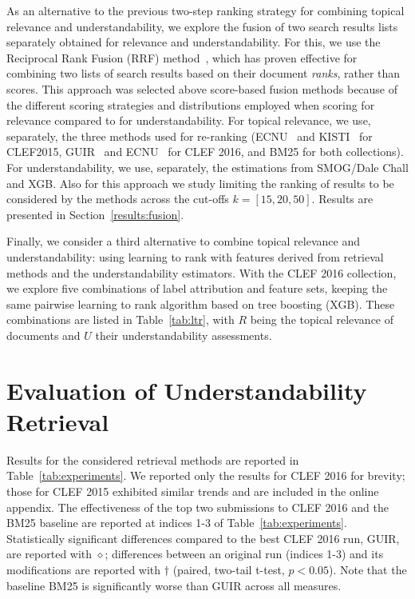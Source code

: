 As an alternative to the previous two-step ranking strategy for combining topical relevance and understandability, we explore the fusion of two search results lists separately obtained for relevance and understandability. For this, we use the Reciprocal Rank Fusion (RRF) method~\cite{cormack09}, which has proven effective for combining two lists of search results based on their document \textit{ranks}, rather than scores. This approach was selected above score-based fusion methods because of the different scoring strategies and distributions employed when scoring for relevance compared to for understandability. For topical relevance, we use, separately, the three methods used for re-ranking (ECNU~\cite{song15} and KISTI~\cite{oh15} for CLEF2015, GUIR~\cite{soldaini16} and ECNU~\cite{song16} for CLEF 2016, and BM25 for both collections). For understandability, we use, separately, the estimations from SMOG/Dale Chall and XGB. Also for this approach we study limiting the ranking of
results to be considered by the methods across the cut-offs $k=[15, 20, 50]$. Results are presented in Section~\ref{results:fusion}.

Finally, we consider a third alternative to combine topical relevance and understandability: using learning to rank with features derived from retrieval methods and the understandability estimators.
With the CLEF 2016 collection, we explore five combinations of label attribution and feature sets, keeping the same pairwise learning to rank algorithm based on tree boosting (XGB).
These combinations are listed in Table~\ref{tab:ltr}, with $R$ being the topical relevance of documents and $U$ their understandability assessments. 

\section{Evaluation of Understandability Retrieval}
\label{sec:results}



Results for the considered retrieval methods are reported in Table~\ref{tab:experiments}. We reported only the results for CLEF 2016 for brevity; those for CLEF 2015 exhibited similar trends and are included in the online appendix. The effectiveness of the top two submissions to CLEF 2016 and the BM25 baseline are reported at indices 1-3 of Table~\ref{tab:experiments}. Statistically significant differences compared to the best CLEF 2016 run, GUIR, are reported with $\diamond$; differences between an original run (indices 1-3) and its modifications are reported with $\dagger$ (paired, two-tail t-test, $p<0.05$). Note that the baseline BM25 is significantly worse than GUIR across all measures. 

